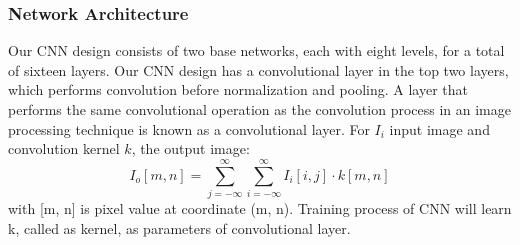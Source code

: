\documentclass[letterpaper, 10 pt, conference]{ieeeconf}  %
\begin{document}
\subsubsection*{\bf Network Architecture}
Our CNN design consists of two base networks, each with eight levels, for a total of sixteen layers. Our CNN design has a convolutional layer in the top two layers, which performs convolution before normalization and pooling. A layer that performs the same convolutional operation as the convolution process in an image processing technique is known as a convolutional layer. For $I_i$ input image and convolution kernel $k$, the output image:
$$I_o[m,n] = \sum_{j=-\infty}^{\infty} \sum_{i=-\infty}^{\infty} I_i[i,j]\cdot k[m,n]$$
with [m, n] is pixel value at coordinate (m, n). Training process of CNN will learn k, called as kernel, as parameters of convolutional layer. \par
\end{document}
